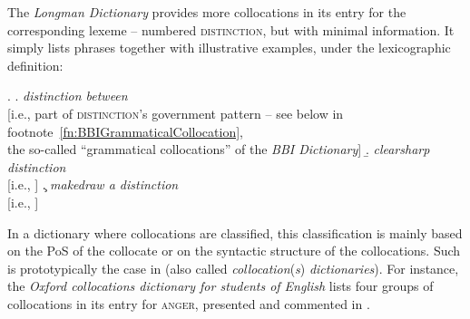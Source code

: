 The \textit{Longman Dictionary} \parencite{Longman2025} provides more collocations in its entry for the corresponding lexeme -- numbered \textsc{distinction}, but with minimal information. It simply lists phrases \Next[a--c] together with illustrative examples, under the lexicographic definition:

\begingroup
\small

\ex. \a. \textit{distinction between} \\
         {\footnotesize [i.e., part of \textsc{distinction}'s government pattern -- see below in footnote~\ref{fn:BBIGrammaticalCollocation},\\ the so-called ``grammatical collocations'' of the \textit{BBI Dictionary}]}
     \b. \textit{clear}\slashs\textit{sharp distinction} \\
         {\footnotesize [i.e., ]}
     \c. \textit{make}\slashs\textit{draw a distinction} \\
         {\footnotesize [i.e., ]}

\endgroup{}

In a dictionary where collocations are classified, this classification is mainly based on the PoS of the collocate or on the syntactic structure of the collocations. Such is prototypically the case in  (also called \textit{collocation}(\textit{s}) \textit{dictionaries}). For instance, the \textit{Oxford collocations dictionary for students of English} \parencite{OCD2022} lists four groups of collocations in its entry for \textsc{anger}, presented and commented in .

